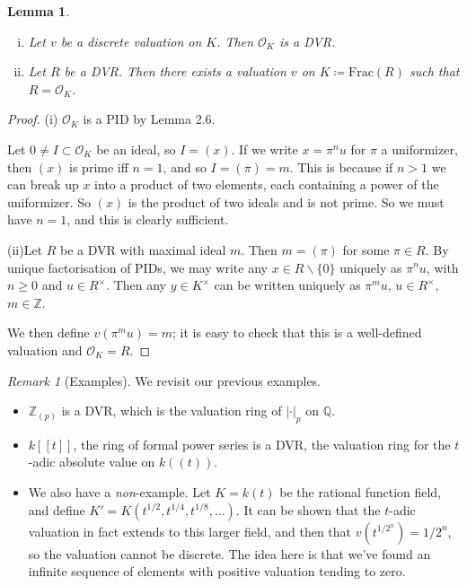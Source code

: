 \documentclass[]{article}
\theoremstyle{custhm}
\theoremstyle{cusdef}
\theoremstyle{custhm}
\newtheorem{lemma}[theorem]{Lemma}
\theoremstyle{custhm}
\theoremstyle{custhm}
\theoremstyle{custhm}
\theoremstyle{cusdef}
\theoremstyle{remark}
\newtheorem*{remark*}{Remark}
\newcommand{\Z}{\mathbb{Z}}
\newcommand{\Q}{\mathbb{Q}}
\renewcommand{\it}[1]{\textit{#1}}
\renewcommand{\O}{\mathcal{O}}
\begin{document}
\begin{lemma}\ 
\begin{enumerate}[(i)]
	\item Let $v$ be a discrete valuation on $K$. Then $\O_K$ is a DVR.
	\item Let $R$ be a DVR. Then there exists a valuation $v$ on $K\coloneqq \textrm{Frac}(R)$ such that $R = \O_K$.
\end{enumerate}
\end{lemma}
\begin{proof}
(i) $\O_K$ is a PID by Lemma 2.6.

Let $0\ne I \subset \O_K$ be an ideal, so $I = (x)$. If we write $x = \pi^nu$ for $\pi$ a uniformizer, then $(x)$ is prime iff $n = 1$, and so $I = (\pi) = m$. This is because if $n > 1$ we can break up $x$ into a product of two elements, each containing a power of the uniformizer. So $(x)$ is the product of two ideals and is not prime. So we must have $n = 1$, and this is clearly sufficient.

(ii)Let $R$ be a DVR with maximal ideal $m$. Then $m = (\pi)$ for some $\pi \in R$. By unique factorisation of PIDs, we may write any $x\in R\backslash \{0\}$ uniquely as $\pi^n u$, with $n\ge 0$ and $u\in R^\times$. Then any $y\in K^\times$ can be written uniquely as $\pi^mu$, $u\in R^\times$, $m\in \Z$.

We then define $v(\pi^mu) = m$; it is easy to check that this is a well-defined valuation and $\O_K = R$.
\end{proof}

\begin{remark*}[Examples]
We revisit our previous examples.
\begin{itemize}
	\item $\Z_{(p)}$ is a DVR, which is the valuation ring of $|\cdot|_p$ on $\Q$.
	\item $k[[t]]$, the ring of formal power series is a DVR, the valuation ring for the $t$-adic absolute value on $k((t))$.
	\item We also have a \it{non}-example. Let $K = k(t)$ be the rational function field, and define $K' = K(t^{1/2},t^{1/4},t^{1/8},\dots)$. It can be shown that the $t$-adic valuation in fact extends to this larger field, and then that $v(t^{1/2^n}) = 1/2^n$, so the valuation cannot be discrete. The idea here is that we've found an infinite sequence of elements with positive valuation tending to zero.
\end{itemize}
\end{remark*}
\end{document}
